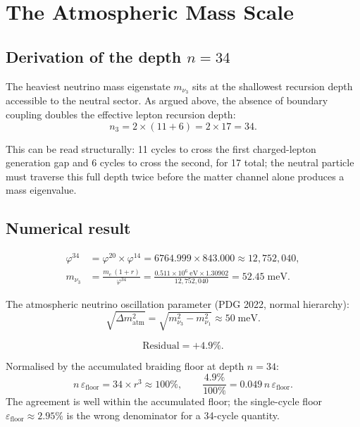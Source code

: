 \documentclass[12pt]{article}
\begin{document}
\section{The Atmospheric Mass Scale}

\subsection{Derivation of the depth $n = 34$}

The heaviest neutrino mass eigenstate $m_{\nu_3}$ sits at the
shallowest recursion depth accessible to the neutral sector.  As
argued above, the absence of boundary coupling doubles the effective
lepton recursion depth:
\begin{equation}
  n_3 = 2 \times (11 + 6) = 2 \times 17 = 34.
  \label{eq:n3}
\end{equation}

This can be read structurally: 11 cycles to cross the first
charged-lepton generation gap and 6 cycles to cross the second, for
17 total; the neutral particle must traverse this full depth twice
before the matter channel alone produces a mass eigenvalue.

\subsection{Numerical result}

\begin{align}
  \varphi^{34} &= \varphi^{20} \times \varphi^{14}
               = 6764.999 \times 843.000 \approx 12{,}752{,}040,\\[4pt]
  m_{\nu_3}   &= \frac{m_e\,(1+r)}{\varphi^{34}}
               = \frac{0.511 \times 10^6 \;\text{eV}\times 1.30902}
                      {12{,}752{,}040}
               = 52.45\;\text{meV}.
\end{align}

The atmospheric neutrino oscillation parameter (PDG 2022,
normal hierarchy):
\begin{equation}
  \sqrt{\Delta m^2_{\text{atm}}}
    = \sqrt{m_{\nu_3}^2 - m_{\nu_1}^2}
    \approx 50\;\text{meV}.
\end{equation}

\[
  \text{Residual} = +4.9\%.
\]

Normalised by the accumulated braiding floor at depth $n = 34$:
\[
  n\,\varepsilon_{\text{floor}} = 34 \times r^3 \approx 100\%,
  \qquad
  \frac{4.9\%}{100\%} = 0.049\,n\,\varepsilon_{\text{floor}}.
\]
The agreement is well within the accumulated floor; the single-cycle
floor $\varepsilon_{\text{floor}} \approx 2.95\%$ is the wrong
denominator for a 34-cycle quantity.
\end{document}
